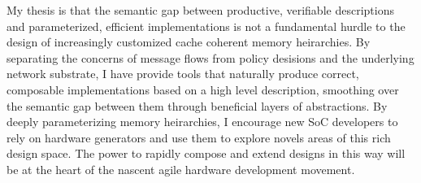 My thesis is that the semantic gap between productive, verifiable descriptions and parameterized, efficient implementations
is not a fundamental hurdle to the design of increasingly customized cache coherent memory heirarchies.
By separating the concerns of message flows from policy desisions and the underlying network substrate,
I have provide tools that naturally produce correct, composable implementations based on a high level description,
smoothing over the semantic gap between them through beneficial layers of abstractions.
By deeply parameterizing memory heirarchies, I encourage new SoC developers to rely on hardware generators
and use them to explore novels areas of this rich design space.
The power to rapidly compose and extend designs in this way will be at the heart of the nascent agile hardware development movement.

